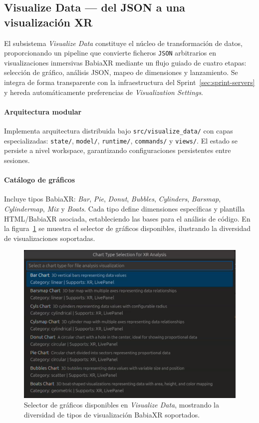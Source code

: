 \documentclass[a4paper, 12pt]{book}
\begin{document}

\subsection{Visualize Data — del JSON a una visualización XR}
\label{sec:visualize-data}

El subsistema \emph{Visualize Data} constituye el núcleo de transformación de datos, proporcionando un pipeline que convierte ficheros \texttt{JSON} arbitrarios en visualizaciones inmersivas BabiaXR mediante un flujo guiado de cuatro etapas: selección de gráfico, análisis JSON, mapeo de dimensiones y lanzamiento. Se integra de forma transparente con la infraestructura del Sprint~\ref{sec:sprint-servers} y hereda automáticamente preferencias de \emph{Visualization Settings}.

\paragraph{Arquitectura modular}
Implementa arquitectura distribuida bajo \texttt{src/visualize\_data/} con capas especializadas: \texttt{state/}, \texttt{model/}, \texttt{runtime/}, \texttt{commands/} y \texttt{views/}. El estado se persiste a nivel workspace, garantizando configuraciones persistentes entre sesiones.

\paragraph{Catálogo de gráficos}
Incluye tipos BabiaXR: \emph{Bar}, \emph{Pie}, \emph{Donut}, \emph{Bubbles}, \emph{Cylinders}, \emph{Barsmap}, \emph{Cylindermap}, \emph{Mix} y \emph{Boats}. Cada tipo define dimensiones específicas y plantilla HTML/BabiaXR asociada, estableciendo las bases para el análisis de código. En la figura~\ref{fig:visualize-chart-selector} se muestra el selector de gráficos disponibles, ilustrando la diversidad de visualizaciones soportadas.

\begin{figure}[H]
\centering
\includegraphics[width=0.58\linewidth]{img/graficos_babiaxr.png}
\caption{Selector de gráficos disponibles en \emph{Visualize Data}, mostrando la diversidad de tipos de visualización BabiaXR soportados.}
\label{fig:visualize-chart-selector}
\end{figure}
\end{document}
